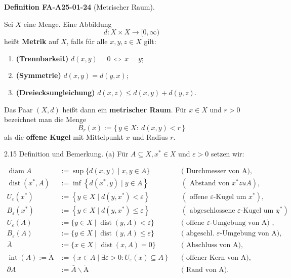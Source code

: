 \documentclass[10pt, letterpaper]{article}
\newcommand{\CustomHeading}[3]{%
  \par\medskip\noindent%
  \textbf{#1 #2} \textnormal{(#3)}.\enskip%
}
\newenvironment{DEF}[2]{\begin{unitbox}\CustomHeading{Definition}{#1}{#2}}{\end{unitbox}}
\def\AA{\mathring{\mathrm{A}}}
\begin{document}
\begin{DEF}{FA-A25-01-24}{Metrischer Raum}
Sei $X$ eine Menge.  
Eine Abbildung
\[
d: X \times X \longrightarrow [0,\infty)
\]
heißt \textbf{Metrik} auf $X$, falls für alle $x,y,z\in X$ gilt:

\begin{enumerate}[label=(M\arabic*)]
\item \textbf{(Trennbarkeit)}  
      $d(x,y)=0 \ \Longleftrightarrow\ x=y$;
\item \textbf{(Symmetrie)}  
      $d(x,y)=d(y,x)$;
\item \textbf{(Dreiecksungleichung)}  
      $d(x,z)\le d(x,y)+d(y,z)$.
\end{enumerate}

Das Paar $(X,d)$ heißt dann ein \textbf{metrischer Raum}.  
Für $x\in X$ und $r>0$ bezeichnet man die Menge
\[
B_{r}(x):=\{\,y\in X:\ d(x,y)<r\,\}
\]
als die \textbf{offene Kugel} mit Mittelpunkt $x$ und Radius $r$.
\end{DEF}


2.15 Definition und Bemerkung. (a) Für $A \subseteq X, x^{*} \in X$ und $\varepsilon>0$ setzen wir:

$$
\begin{aligned}
\operatorname{diam} A & :=\sup \{d(x, y) \mid x, y \in A\} & & (\text { Durchmesser von A), } \\
\operatorname{dist}\left(x^{*}, A\right) & :=\inf \left\{d\left(x^{*}, y\right) \mid y \in A\right\} & & \left(\text { Abstand von } x^{*} z u A\right), \\
U_{\varepsilon}\left(x^{*}\right) & :=\left\{y \in X \mid d\left(y, x^{*}\right)<\varepsilon\right\} & & \left(\text { offene } \varepsilon \text {-Kugel um } x^{*}\right), \\
B_{\varepsilon}\left(x^{*}\right) & :=\left\{y \in X \mid d\left(y, x^{*}\right) \leq \varepsilon\right\} & & \left(\text { abgeschlossene } \varepsilon \text {-Kugel um } x^{*}\right), \\
U_{\varepsilon}(A) & :=\{y \in X \mid \operatorname{dist}(y, A)<\varepsilon\} & & (\text { offene } \varepsilon \text {-Umgebung von A) }, \\
B_{\varepsilon}(A) & :=\{y \in X \mid \operatorname{dist}(y, A) \leq \varepsilon\} & & (\text { abgeschl. } \varepsilon \text {-Umgebung von A), } \\
\bar{A} & :=\{x \in X \mid \operatorname{dist}(x, A)=0\} & & (\text { Abschluss von A), } \\
\operatorname{int}(A):=\AA & :=\left\{x \in A \mid \exists \varepsilon>0: U_{\varepsilon}(x) \subseteq A\right\} & & (\text { offener Kern von A), } \\
\partial A & :=\bar{A} \backslash \AA & & (\text { Rand von A). }
\end{aligned}
$$
\end{document}
